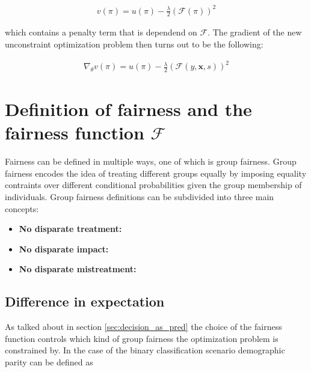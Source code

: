 \documentclass[
	a4paper,
	11pt
	]{article}
\begin{document}
\begin{align*}
    v(\pi) = u(\pi) - \frac{\lambda}{2}(\mathcal{F}(\pi))^2
\end{align*}

which contains a penalty term that is dependend on $\mathcal{F}$. The gradient of the new unconstraint optimization problem then turns out to be the following:

\begin{align*}
    \nabla_{\theta} v(\pi) = u(\pi) - \frac{\lambda}{2}(\mathcal{F}(y, \boldsymbol{x}, s))^2
\end{align*}

\section{Definition of fairness and the fairness function $\mathcal{F}$}
Fairness can be defined in multiple ways, one of which is group fairness. Group fairness encodes the idea of treating different groups equally by imposing equality contraints over different conditional probabilities given the group membership of individuals. Group fairness definitions can be subdivided into three main concepts:

\begin{itemize}
    \item \textbf{No disparate treatment:}
    \item \textbf{No disparate impact:}
    \item \textbf{No disparate mistreatment:}
\end{itemize}

\subsection{Difference in expectation}
\label{sec:diff_in_exp}
As talked about in section \ref{sec:decision_as_pred} the choice of the fairness function controls which kind of group fairness the optimization problem is constrained by. In the case of the binary classification scenario demographic parity can be defined as
\end{document}
